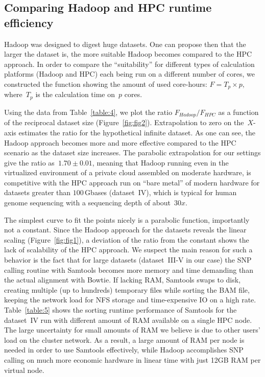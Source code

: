 \documentclass[10pt]{article}
\newcommand{\COMMENT}[1]{{\color{red} #1 }}
\begin{document}
\subsection*{Comparing Hadoop and HPC runtime efficiency}
Hadoop was designed to digest huge datasets\cite{hadoop,lin2010}. One can propose then that the larger the dataset is, the more suitable Hadoop becomes compared to the HPC approach. In order to compare the ``suitability'' for different types of calculation platforms (Hadoop and HPC) each being run on a different number of cores, we constructed the function showing the amount of used core-hours:
$F=T_{p}\times p,$ 
where~$T_{p}$ is the calculation time on~$p$ cores. 

Using the data from Table~\ref{table:4}, we plot the ratio $F_{Hadoop}/F_{HPC}$ as a function of the reciprocal dataset size (Figure~\ref{fig:fig2}). Extrapolation to zero on the~$X$-axis estimates the ratio for the hypothetical infinite dataset. As one can see, the Hadoop approach becomes more and more effective compared to the HPC scenario as the dataset size increases. 
The parabolic extrapolation for our settings give the ratio as~$1.70\pm0.01$, meaning that Hadoop running even in the virtualized environment of a private cloud assembled on moderate hardware, is competitive with the HPC approach run on ``bare metal'' of modern hardware for datasets greater than $100$\,Gbases (dataset~IV), which is typical for human genome sequencing with a sequencing depth of about~$30x$.


The simplest curve to fit the points nicely is a parabolic function, importantly not a constant. 
Since the Hadoop approach for the datasets reveals the linear scaling (Figure~\ref{fig:fig1}), a deviation of the ratio from the constant shows the 
lack of scalability of the HPC approach.
We suspect the main reason for such a behavior is the fact that for large datasets (dataset~III-V in our case) the SNP calling routine with Samtools becomes more memory and time demanding than the actual alignment with Bowtie.
If lacking RAM, Samtools  swaps to disk, creating multiple (up to hundreds) temporary files while sorting the BAM file, keeping the network load for NFS storage and time-expensive IO on a high rate.
Table~\ref{table:5} shows the sorting runtime performance of Samtools for the dataset~IV run with different amount of RAM available on a single HPC node. The large uncertainty for small amounts of RAM we believe is due to other users' load on the cluster network. As a result, a large amount of RAM per node is needed in order to use Samtools effectively, while Hadoop accomplishes SNP calling on much more economic hardware in linear time with just 12GB RAM per virtual node.
\end{document}

